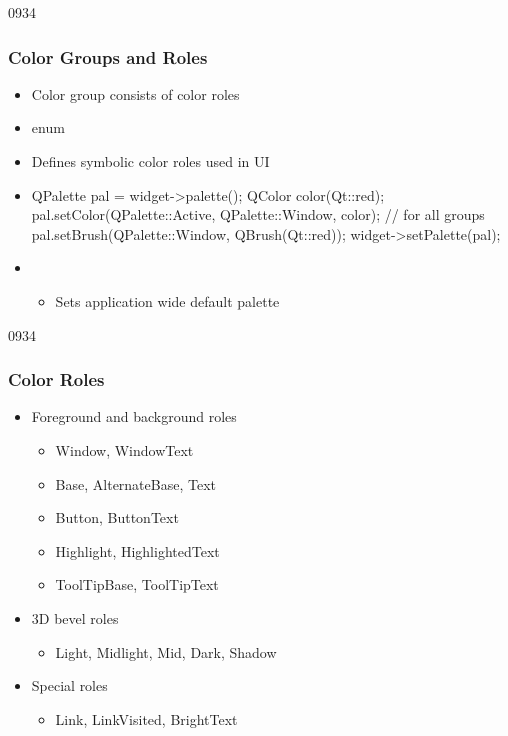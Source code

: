 \begin{slide}[fragile]{0934}\frametitle{Color Groups and Roles}
\begin{itemize}
  \item Color group consists of color roles
  \item enum 
  \item Defines symbolic color roles used in UI
\end{itemize}
\begin{itemize}
  \item[] \begin{cpp}
QPalette pal = widget->palette();               
QColor color(Qt::red);
pal.setColor(QPalette::Active, QPalette::Window, color);
// for all groups
pal.setBrush(QPalette::Window, QBrush(Qt::red));
widget->setPalette(pal);
  \end{cpp}  
  \item {}
  \begin{itemize}
    \item Sets application wide default palette
  \end{itemize} 
\end{itemize}
\end{slide} 

\begin{slide}[fragile]{0934}\frametitle{Color Roles}
\begin{itemize}
\item Foreground and background roles
  \begin{itemize}
  \item Window, WindowText
  \item Base, AlternateBase, Text
  \item Button, ButtonText
  \item Highlight, HighlightedText
  \item ToolTipBase, ToolTipText
  \end{itemize}
\item 3D bevel roles
  \begin{itemize}
  \item Light, Midlight, Mid, Dark, Shadow
  \end{itemize}
\item Special roles
  \begin{itemize}
  \item Link, LinkVisited, BrightText
  \end{itemize}
\end{itemize}
\end{slide} 

